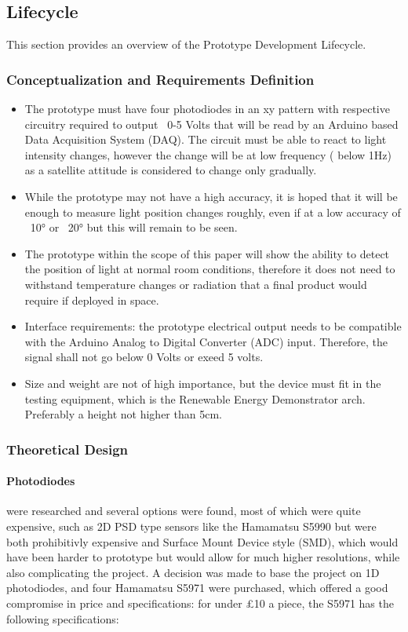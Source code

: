 \subsection{Lifecycle}
This section provides an overview of the Prototype Development Lifecycle.

\subsubsection*{Conceptualization and Requirements Definition}
\begin{itemize}
  \item The prototype must have four photodiodes in an xy pattern with respective circuitry required to output ~0-5 Volts that will be read by an Arduino based Data Acquisition System (DAQ). The circuit must be able to react to light intensity changes, however the change will be at low frequency ( below 1Hz) as a satellite attitude is considered to change only gradually.
  \item While the prototype may not have a high accuracy, it is hoped that it will be enough to measure light position changes roughly, even if at a low accuracy of ~10° or ~20° but this will remain to be seen.  
  \item The prototype within the scope of this paper will show the ability to detect the position of light at normal room conditions, therefore it does not need to withstand temperature changes or radiation that a final product would require if deployed in space.
  \item Interface requirements: the prototype electrical output needs to be compatible with the Arduino Analog to Digital Converter (ADC) input. Therefore, the signal shall not go below 0 Volts or exeed 5 volts. 
  \item Size and weight are not of high importance, but the device must fit in the testing equipment, which is the Renewable Energy Demonstrator arch. Preferably a height not higher than 5cm.
\end{itemize}
\subsubsection*{Theoretical Design}

\paragraph{Photodiodes} were researched and several options were found, most of which were quite expensive, such as 2D PSD type sensors like the Hamamatsu S5990 but were both prohibitivly expensive and Surface Mount Device style (SMD), which would have been harder to prototype but would allow for much higher resolutions, while also complicating the project. A decision was made to base the project on 1D photodiodes, and four Hamamatsu S5971 were purchased, which offered a good compromise in price and specifications: for under £10 a piece, the S5971 has the following specifications:

